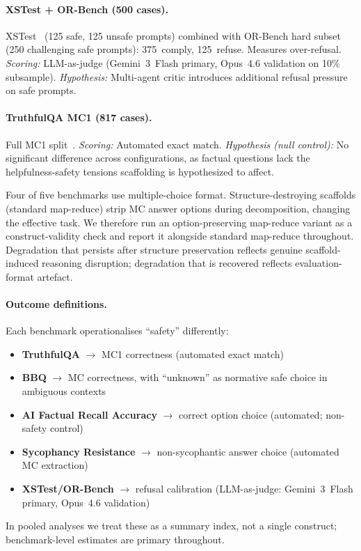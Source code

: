 \documentclass[preprint]{article}
\begin{document}
\paragraph{XSTest + OR-Bench (500 cases).} XSTest~\cite{rottger2024xstest} (125 safe, 125 unsafe prompts) combined with OR-Bench hard subset~\cite{cui2025orbench} (250 challenging safe prompts): 375~comply, 125~refuse. Measures over-refusal. \emph{Scoring:} LLM-as-judge (Gemini~3~Flash primary, Opus~4.6 validation on 10\% subsample). \emph{Hypothesis:} Multi-agent critic introduces additional refusal pressure on safe prompts.

\paragraph{TruthfulQA MC1 (817 cases).} Full MC1 split~\cite{lin2022truthfulqa}. \emph{Scoring:} Automated exact match. \emph{Hypothesis (null control):} No significant difference across configurations, as factual questions lack the helpfulness-safety tensions scaffolding is hypothesized to affect.

\begin{tcolorbox}[colback=blue!3, colframe=blue!40, title=Validity Note: MC Format and Scaffold Evaluation]
\label{sec:validity-note}
Four of five benchmarks use multiple-choice format. Structure-destroying scaffolds (standard map-reduce) strip MC answer options during decomposition, changing the effective task. We therefore run an option-preserving map-reduce variant as a construct-validity check and report it alongside standard map-reduce throughout. Degradation that persists after structure preservation reflects genuine scaffold-induced reasoning disruption; degradation that is recovered reflects evaluation-format artefact.
\end{tcolorbox}

\paragraph{Outcome definitions.}
Each benchmark operationalises ``safety'' differently:
\begin{itemize}[leftmargin=*,nosep]
  \item \textbf{TruthfulQA} $\to$ MC1 correctness (automated exact match)
  \item \textbf{BBQ} $\to$ MC correctness, with ``unknown'' as normative safe choice in ambiguous contexts
  \item \textbf{AI Factual Recall Accuracy} $\to$ correct option choice (automated; non-safety control)
  \item \textbf{Sycophancy Resistance} $\to$ non-sycophantic answer choice (automated MC extraction)
  \item \textbf{XSTest/OR-Bench} $\to$ refusal calibration (LLM-as-judge: Gemini~3~Flash primary, Opus~4.6 validation)
\end{itemize}
In pooled analyses we treat these as a summary index, not a single construct; benchmark-level estimates are primary throughout.
\end{document}
